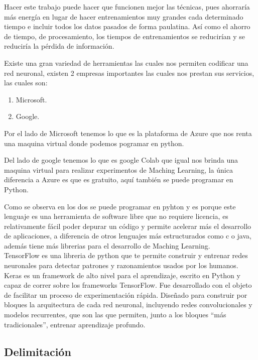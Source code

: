 Hacer este trabajo puede hacer que funcionen mejor las técnicas, pues ahorraría más energía 
en lugar de hacer entrenamientos muy grandes cada determinado tiempo e incluir todos los datos 
pasados de forma paulatina. Así como el ahorro de tiempo, de procesamiento, los tiempos de 
entrenamientos se reducirían y se reduciría la pérdida de información.

Existe una gran variedad de herramientas las cuales nos permiten codificar una red neuronal, existen 2 empresas 
importantes las cuales nos prestan sus servicios, las cuales son:
\begin{enumerate}
    \item Microsoft.
    \item Google.
\end{enumerate}
Por el lado de Microsoft tenemos lo que es la plataforma de Azure que nos renta una maquina virtual donde podemos 
pogramar en python.

Del lado de google tenemos lo que es google Colab que igual nos brinda una maquina virtual para realizar experimentos de Maching
Learning, la \'unica diferencia a Azure es que es gratuito, aqu\'i también se puede programar en Python.

Como se observa en los dos se puede programar en pyhton y es porque este lenguaje es una herramienta de 
software libre que no requiere licencia, es relativamente fácil poder depurar un código y permite acelerar 
más el desarrollo de aplicaciones,  a diferencia de otros lenguajes más estructurados 
como c o java, adem\'as tiene m\'as librerias para el desarrollo de Maching Learning. \\

TensorFlow es una libreria de python que te permite construir y entrenar redes neuronales para detectar patrones y
razonamientos usados por los humanos. \\

Keras es un framework de alto nivel para el aprendizaje, escrito en Python y capaz de correr sobre los 
frameworks TensorFlow. Fue desarrollado con el objeto de facilitar un proceso de experimentación rápida. Diseñado para construir por bloques la arquitectura de cada red neuronal, incluyendo redes convolucionales y modelos recurrentes, que son las que permiten, junto a los bloques “más tradicionales”, entrenar aprendizaje profundo.


\subsection{Delimitación}
    
